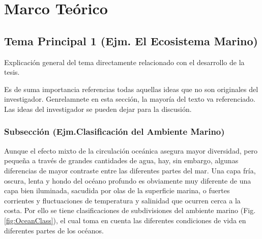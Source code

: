 \chapter{Marco Teórico}
\thispagestyle{empty} %
\section{Tema Principal 1 (Ejm. El Ecosistema Marino)}

Explicación general del tema directamente relacionado con el desarrollo de la tesis. 

Es de suma importancia referencias todas aquellas ideas que no son originales del investigador. Genrelamnete en esta sección, la mayoría del texto va referenciado. Las ideas del investigador se pueden dejar para la discusión.


\subsection{Subsección (Ejm.Clasificación del Ambiente Marino)}

Aunque el efecto mixto de la circulación oceánica asegura mayor diversidad, pero pequeña a través de grandes cantidades de agua, hay, sin embargo, algunas diferencias de mayor contraste entre las diferentes partes del mar. Una capa fría, oscura, lenta y hondo del océano profundo es obviamente muy diferente de una capa bien iluminada, sacudida por olas de la superficie marina, o fuertes corrientes y fluctuaciones de temperatura y salinidad que ocurren cerca a la costa. Por ello se tiene clasificaciones de subdivisiones del ambiente marino (Fig. \ref{fig:OceanClass}), el cual toma en cuenta las diferentes condiciones de vida en diferentes partes de los océanos.


